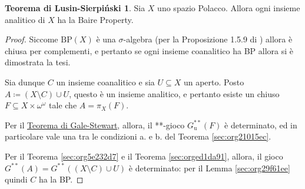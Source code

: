 \documentclass[titlepage]{article}
\newcommand{\1}{\mathds{1}}
\theoremstyle{definition}%
\newtheorem{LS}[thm]{Teorema di Lusin-Sierpiński}
\theoremstyle{plain}
\theoremstyle{remark}
\begin{document}
\begin{LS}\label{sec:org65a9bfc}
Sia \(X\) uno {spazio Polacco}. Allora ogni {insieme analitico} di \(X\) ha la {Baire Property}.
\end{LS}
\begin{proof}
Siccome \(\mathrm{BP}(X)\) è una {\(\sigma\)-algebra} (per la Proposizione 1.5.9 di \cite{lmr}) allora è chiusa per complementi, e pertanto se ogni insieme coanalitico ha BP allora si è dimostrata la tesi.

Sia dunque \(C\) un insieme coanalitico e sia \(U \subseteq X\) un aperto. Posto \(A\coloneqq (X\setminus C)\cup U\), questo è un insieme analitico, e pertanto  esiste un chiuso \(F \subseteq X\times\omega^{\omega}\) tale che \(A=\pi_{X}(F)\).

Per il \hyperref[sec:orgf56b48c]{Teorema di Gale-Stewart}, allora, il {**-gioco \(G^{ * *}_{\text{u}}(F)\)} è {determinato}, ed in particolare vale una tra le condizioni a. e b. del Teorema \ref{sec:org21015ec}.

Per il {Teorema \ref{sec:org5e232d7}} e il Teorema \ref{sec:orged1da91}, allora, il {gioco \(G^{**}(A) = G^{ * *}\left((X\setminus C) \cup U\right)\)} è determinato: per il Lemma \ref{sec:org29f61ee} quindi \(C\) ha la BP.
\end{proof}

\cleardoublepage
\printbibliography %
\end{document}
